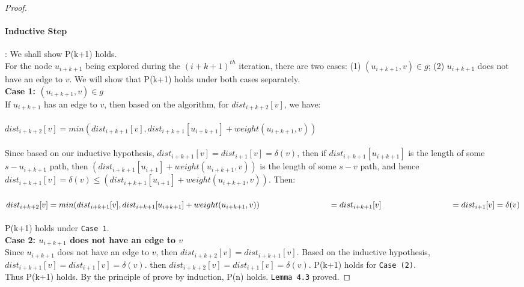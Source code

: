 \begin{proof}
\paragraph*{Inductive Step}: We shall show P(k+1) holds. 
\\
For the node $u_{i+k+1}$ being explored during the $(i+k+1)^{th}$ iteration, there are two cases: (1) $(u_{i+k+1}, v) \in g$; (2) $u_{i+k+1}$ does not have an edge to $v$. We will show that P(k+1) holds under both cases separately. 
\\
\textbf{Case 1: $(u_{i+k+1}, v) \in g$}
\\
If $u_{i+k+1}$ has an edge to $v$, then based on the algorithm, for $dist_{i+k+2}[v]$, we have: 
\\\\
  \tab $dist_{i+k+2}[v] = min(dist_{i+k+1}[v], dist_{i+k+1}[u_{i+k+1}] + weight(u_{i+k+1}, v))$
\\\\
Since based on our inductive hypothesis, $dist_{i+k+1}[v] = dist_{i+1}[v] = \delta(v)$, then if $dist_{i+k+1}[u_{i+k+1}] $ is the length of some $s-u_{i+k+1}$ path, then $(dist_{i+k+1}[u_{i+1}] + weight(u_{i+k+1}, v))$ is the length of some $s-v$ path, and hence $dist_{i+k+1}[v] = \delta(v) \leq (dist_{i+k+1}[u_{i+1}] + weight(u_{i+k+1}, v))$. Then: 
\\\\
 \tab $dist_{i+k+2}[v] = min(dist_{i+k+1}[v], dist_{i+k+1}[u_{i+k+1}] + weight(u_{i+k+1}, v)) \\
 \tab\tab\tab = dist_{i+k+1}[v]\\
 \tab\tab\tab = dist_{i+1}[v] = \delta(v)$
\\\\
P(k+1) holds under \texttt{Case 1}. 
\\
\textbf{Case 2: $u_{i+k+1}$ does not have an edge to $v$}
\\
Since $u_{i+k+1}$ does not have an edge to $v$, then $dist_{i+k+2}[v] = dist_{i+k+1}[v]$. Based on the inductive hypothesis, $dist_{i+k+1}[v] = dist_{i+1}[v] = \delta(v)$. then $dist_{i+k+2}[v] = dist_{i+1}[v] = \delta(v)$. P(k+1) holds for \texttt{Case (2)}. 
\\
Thus P(k+1) holds. By the principle of prove by induction, P(n) holds. \texttt{Lemma 4.3} proved. 

\end{proof}
